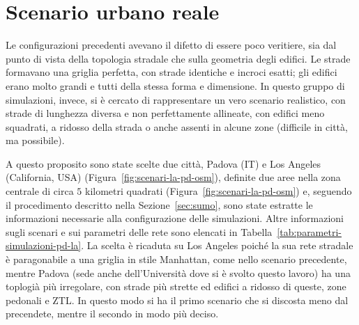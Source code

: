 \section{Scenario urbano reale} %
Le configurazioni precedenti avevano il difetto di essere poco veritiere, sia dal punto di vista della topologia stradale
che sulla geometria degli edifici.
Le strade formavano una griglia perfetta, con strade identiche e incroci esatti;
gli edifici erano molto grandi e tutti della stessa forma e dimensione.
In questo gruppo di simulazioni, invece, si è cercato di rappresentare un vero scenario realistico,
con strade di lunghezza diversa e non perfettamente allineate,
con edifici meno squadrati, a ridosso della strada o anche assenti in alcune zone (difficile in città, ma possibile).

A questo proposito sono state scelte due città, Padova (IT) e Los Angeles (California, USA) (Figura~\ref{fig:scenari-la-pd-osm}), definite due aree nella zona centrale di circa $5$ kilometri quadrati (Figura~\ref{fig:scenari-la-pd-osm})
e, seguendo il procedimento descritto nella Sezione~\ref{sec:sumo}, sono state estratte le informazioni necessarie alla configurazione delle simulazioni.
Altre informazioni sugli scenari e sui parametri delle rete sono elencati in Tabella~\ref{tab:parametri-simulazioni-pd-la}.
La scelta è ricaduta su Los Angeles poiché la sua rete stradale è paragonabile a una griglia in stile Manhattan, come nello scenario precedente,
mentre Padova (sede anche dell'Università dove si è svolto questo lavoro) ha una toplogià più irregolare, con strade più strette ed edifici a ridosso di queste,
zone pedonali e ZTL.
In questo modo si ha il primo scenario che si discosta meno dal precendete, mentre il secondo in modo più deciso.
%
